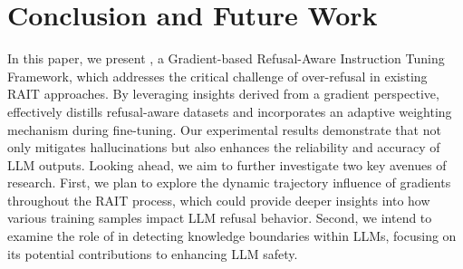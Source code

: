 \section{Conclusion and Future Work}
\label{sec:Conclusion}
In this paper, we present \M, a Gradient-based Refusal-Aware Instruction Tuning Framework, which addresses the critical challenge of over-refusal in existing RAIT approaches. By leveraging insights derived from a gradient perspective, \M effectively distills refusal-aware datasets and incorporates an adaptive weighting mechanism during fine-tuning. Our experimental results demonstrate that \M not only mitigates hallucinations but also enhances the reliability and accuracy of LLM outputs.
Looking ahead, we aim to further investigate two key avenues of research. First, we plan to explore the dynamic trajectory influence of gradients throughout the RAIT process, which could provide deeper insights into how various training samples impact LLM refusal behavior. Second, we intend to examine the role of \M in detecting knowledge boundaries within LLMs, focusing on its potential contributions to enhancing LLM safety.

